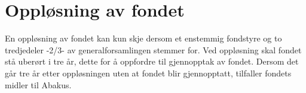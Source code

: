 \section{Oppløsning av fondet}
En oppløsning av fondet kan kun skje dersom et enstemmig fondstyre og to
tredjedeler -2/3- av generalforsamlingen stemmer for. Ved oppløsning skal
fondet stå uberørt i tre år, dette for å oppfordre til gjennopptak av fondet.
Dersom det går tre år etter oppløsningen uten at fondet blir gjennopptatt,
tilfaller fondets midler til Abakus.
